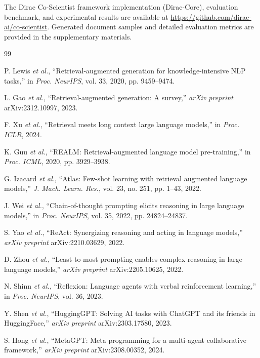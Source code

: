 \documentclass{ieeeaccess}
\begin{document}
The Dirac Co-Scientist framework implementation (Dirac-Core), evaluation benchmark, and experimental results are available at \url{https://github.com/dirac-ai/co-scientist}. Generated document samples and detailed evaluation metrics are provided in the supplementary materials.

\begin{thebibliography}{99}

P. Lewis \emph{et al.}, ``Retrieval-augmented generation for knowledge-intensive NLP tasks,'' in \emph{Proc. NeurIPS}, vol. 33, 2020, pp. 9459--9474.

L. Gao \emph{et al.}, ``Retrieval-augmented generation: A survey,'' \emph{arXiv preprint} arXiv:2312.10997, 2023.

F. Xu \emph{et al.}, ``Retrieval meets long context large language models,'' in \emph{Proc. ICLR}, 2024.

K. Guu \emph{et al.}, ``REALM: Retrieval-augmented language model pre-training,'' in \emph{Proc. ICML}, 2020, pp. 3929--3938.

G. Izacard \emph{et al.}, ``Atlas: Few-shot learning with retrieval augmented language models,'' \emph{J. Mach. Learn. Res.}, vol. 23, no. 251, pp. 1--43, 2022.

J. Wei \emph{et al.}, ``Chain-of-thought prompting elicits reasoning in large language models,'' in \emph{Proc. NeurIPS}, vol. 35, 2022, pp. 24824--24837.

S. Yao \emph{et al.}, ``ReAct: Synergizing reasoning and acting in language models,'' \emph{arXiv preprint} arXiv:2210.03629, 2022.

D. Zhou \emph{et al.}, ``Least-to-most prompting enables complex reasoning in large language models,'' \emph{arXiv preprint} arXiv:2205.10625, 2022.

N. Shinn \emph{et al.}, ``Reflexion: Language agents with verbal reinforcement learning,'' in \emph{Proc. NeurIPS}, vol. 36, 2023.

Y. Shen \emph{et al.}, ``HuggingGPT: Solving AI tasks with ChatGPT and its friends in HuggingFace,'' \emph{arXiv preprint} arXiv:2303.17580, 2023.

S. Hong \emph{et al.}, ``MetaGPT: Meta programming for a multi-agent collaborative framework,'' \emph{arXiv preprint} arXiv:2308.00352, 2024.


\end{thebibliography}
\end{document}
